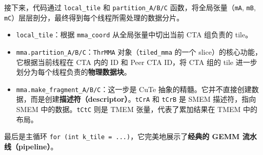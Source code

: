 接下来，代码通过 \texttt{local\_\allowbreak{}tile} 和 \texttt{partition\_\allowbreak{}A/\allowbreak{}B/\allowbreak{}C} 函数，将全局张量（\texttt{m\allowbreak{}A}, \texttt{m\allowbreak{}B}, \texttt{m\allowbreak{}C}）层层剖分，最终得到每个线程所需处理的数据分片。

\begin{itemize}
\item \texttt{local\_\allowbreak{}tile}：根据 \texttt{mma\_\allowbreak{}coord} 从全局张量中切出当前 CTA 组负责的 tile。
\item \texttt{mma.\allowbreak{}partition\_\allowbreak{}A/\allowbreak{}B/\allowbreak{}C}：\texttt{Thr\allowbreak{}MMA} 对象（\texttt{tiled\_\allowbreak{}mma} 的一个 slice）的核心功能，它根据当前线程在 CTA 内的 ID 和 Peer CTA ID，将 CTA 组的 tile 进一步划分为每个线程负责的\textbf{物理数据块}。
\item \texttt{mma.\allowbreak{}make\_\allowbreak{}fragment\_\allowbreak{}A/\allowbreak{}B/\allowbreak{}C}：这一步是 Cu\allowbreak{}Te 抽象的精髓。它并不直接创建数据，而是创建\textbf{描述符（descriptor）}。\texttt{t\allowbreak{}Cr\allowbreak{}A} 和 \texttt{t\allowbreak{}Cr\allowbreak{}B} 是 SMEM 描述符，指向 SMEM 中的数据。\texttt{t\allowbreak{}Ct\allowbreak{}C} 则是 TMEM 张量，代表了累加结果在 TMEM 中的布局。
\end{itemize}

最后是主循环 \texttt{for (int k\_\allowbreak{}tile = .\allowbreak{}.\allowbreak{}.\allowbreak{})}，它完美地展示了\textbf{经典的 GEMM 流水线（pipeline）}。

